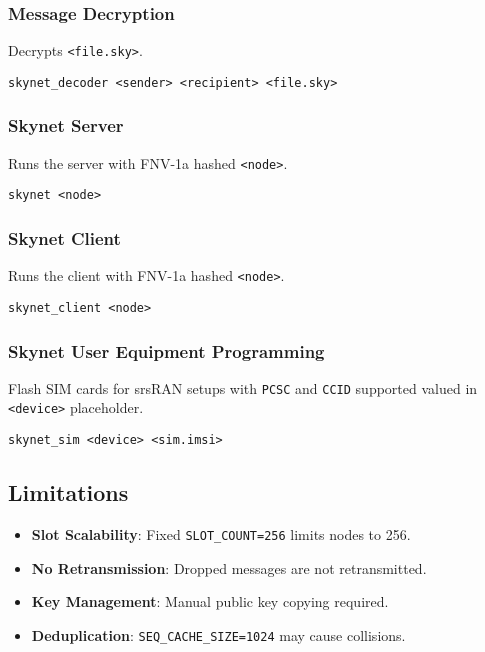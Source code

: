 \documentclass{article}
\begin{document}
\subsubsection*{Message Decryption}
Decrypts \texttt{<file.sky>}.
\begin{lstlisting}
skynet_decoder <sender> <recipient> <file.sky>
\end{lstlisting}

\subsubsection*{Skynet Server}
Runs the server with FNV-1a hashed \texttt{<node>}.
\begin{lstlisting}
skynet <node>
\end{lstlisting}

\subsubsection*{Skynet Client}
Runs the client with FNV-1a hashed \texttt{<node>}.
\begin{lstlisting}
skynet_client <node>
\end{lstlisting}

\subsubsection*{Skynet User Equipment Programming}
Flash SIM cards for srsRAN setups with \texttt{PCSC} and \texttt{CCID} supported valued in \texttt{<device>} placeholder.
\begin{lstlisting}
skynet_sim <device> <sim.imsi>
\end{lstlisting}

\subsection{Limitations}
\begin{itemize}
    \item \textbf{Slot Scalability}: Fixed \texttt{SLOT\_COUNT=256} limits nodes to 256.
    \item \textbf{No Retransmission}: Dropped messages are not retransmitted.
    \item \textbf{Key Management}: Manual public key copying required.
    \item \textbf{Deduplication}: \texttt{SEQ\_CACHE\_SIZE=1024} may cause collisions.
\end{itemize}
\end{document}
